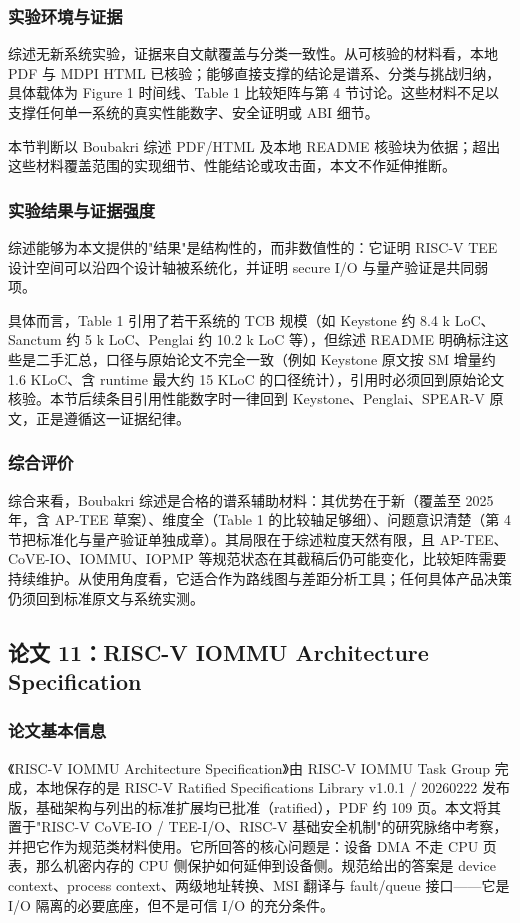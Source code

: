 \documentclass[11pt]{ctexart}
\begin{document}
\subsubsection{实验环境与证据}
综述无新系统实验，证据来自文献覆盖与分类一致性。从可核验的材料看，本地 PDF 与 MDPI HTML 已核验；能够直接支撑的结论是谱系、分类与挑战归纳，具体载体为 Figure 1 时间线、Table 1 比较矩阵与第 4 节讨论。这些材料不足以支撑任何单一系统的真实性能数字、安全证明或 ABI 细节。\par
本节判断以 Boubakri 综述 PDF/HTML 及本地 README 核验块为依据；超出这些材料覆盖范围的实现细节、性能结论或攻击面，本文不作延伸推断。\par
\subsubsection{实验结果与证据强度}
综述能够为本文提供的"结果"是结构性的，而非数值性的：它证明 RISC-V TEE 设计空间可以沿四个设计轴被系统化，并证明 secure I/O 与量产验证是共同弱项。\par
具体而言，Table 1 引用了若干系统的 TCB 规模（如 Keystone 约 8.4 k LoC、Sanctum 约 5 k LoC、Penglai 约 10.2 k LoC 等），但综述 README 明确标注这些是二手汇总，口径与原始论文不完全一致（例如 Keystone 原文按 SM 增量约 1.6 KLoC、含 runtime 最大约 15 KLoC 的口径统计），引用时必须回到原始论文核验。本节后续条目引用性能数字时一律回到 Keystone、Penglai、SPEAR-V 原文，正是遵循这一证据纪律。\par
\subsubsection{综合评价}
综合来看，Boubakri 综述是合格的谱系辅助材料：其优势在于新（覆盖至 2025 年，含 AP-TEE 草案）、维度全（Table 1 的比较轴足够细）、问题意识清楚（第 4 节把标准化与量产验证单独成章）。其局限在于综述粒度天然有限，且 AP-TEE、CoVE-IO、IOMMU、IOPMP 等规范状态在其截稿后仍可能变化，比较矩阵需要持续维护。从使用角度看，它适合作为路线图与差距分析工具；任何具体产品决策仍须回到标准原文与系统实测。\par
\subsection{论文 11：RISC-V IOMMU Architecture Specification}
\subsubsection{论文基本信息}
《RISC-V IOMMU Architecture Specification》由 RISC-V IOMMU Task Group 完成，本地保存的是 RISC-V Ratified Specifications Library v1.0.1 / 20260222 发布版，基础架构与列出的标准扩展均已批准（ratified），PDF 约 109 页。本文将其置于"RISC-V CoVE-IO / TEE-I/O、RISC-V 基础安全机制"的研究脉络中考察，并把它作为规范类材料使用。它所回答的核心问题是：设备 DMA 不走 CPU 页表，那么机密内存的 CPU 侧保护如何延伸到设备侧。规范给出的答案是 device context、process context、两级地址转换、MSI 翻译与 fault/queue 接口——它是 I/O 隔离的必要底座，但不是可信 I/O 的充分条件。\cite{riscv_iommu_2023}\par
\end{document}
